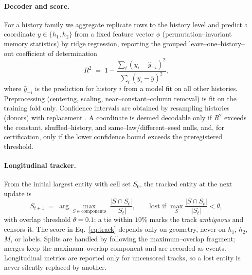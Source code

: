 \documentclass[11pt]{article}
\begin{document}
\paragraph{Decoder and score.} For a history family we aggregate replicate rows to the history level and predict a
coordinate $y\in\{h_1,h_2\}$ from a fixed feature vector $\phi$ (permutation--invariant memory statistics) by ridge
regression, reporting the grouped leave--one--history--out coefficient of determination
\begin{equation}
R^2 \;=\; 1 - \frac{\sum_i (y_i-\hat y_{-i})^2}{\sum_i (y_i-\bar y)^2},
\label{eq:r2}
\end{equation}
where $\hat y_{-i}$ is the prediction for history $i$ from a model fit on all other histories. Preprocessing
(centering, scaling, near--constant--column removal) is fit on the training fold only. Confidence intervals are
obtained by resampling histories (donors) with replacement \citep{efron1979}. A coordinate is deemed decodable only
if $R^2$ exceeds the constant, shuffled--history, and same--law/different--seed nulls, and, for certification, only
if the lower confidence bound exceeds the preregistered threshold.

\paragraph{Longitudinal tracker.} From the initial largest entity with cell set $S_0$, the tracked entity at the
next update is
\begin{equation}
S_{t+1} \;=\; \arg\max_{S\in \text{components}} \; \frac{|S \cap S_t|}{|S_t|},
\qquad \text{lost if } \max_S \frac{|S\cap S_t|}{|S_t|} < \theta,
\label{eq:track}
\end{equation}
with overlap threshold $\theta=0.1$; a tie within $10\%$ marks the track \emph{ambiguous} and censors it. The score
in Eq.~\eqref{eq:track} depends only on geometry, never on $h_1$, $h_2$, $M$, or labels. Splits are handled by
following the maximum--overlap fragment; merges keep the maximum--overlap component and are recorded as events.
Longitudinal metrics are reported only for uncensored tracks, so a lost entity is never silently replaced by another.
\end{document}
